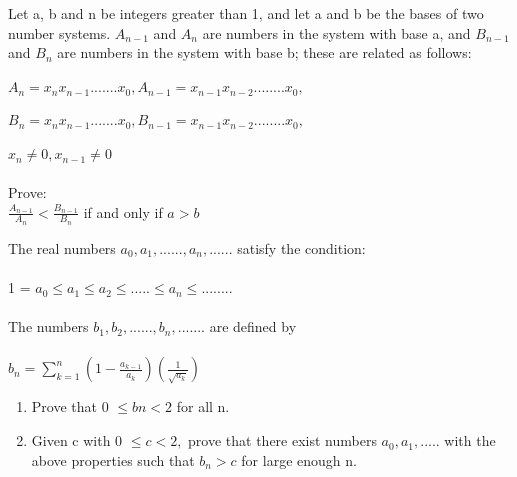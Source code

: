 


\item Let a, b and n be integers greater than 1, and let a and b be the bases of two number systems. $A_{n-1}$ and $A_n$ are numbers in the system with base a,  and $B_{n-1}$ and $B_n$ are numbers in the system with base b; these are related as follows:\\
\\ $A_n = x_nx_{n-1}....... x_0, A_{n-1} = x_{n-1}x_{n-2}........x_0,$\\
\\ $B_n = x_nx_{n-1}....... x_0, B_{n-1} = x_{n-1}x_{n-2}........x_0,$\\
\\ $x_n \neq 0,  x_{n-1} \neq 0$\\
\\ Prove:\\
$\frac{A_{n-1}}{A_n} < \frac{B_{n-1}}{B_n}$ if and only if $a > b$\\

\item The real numbers $a_0, a_1,......, a_n,$...... satisfy the condition:\\
\\ 1 = $a_0 \leq a_1 \leq a_2 \leq ..... \leq a_n \leq ........$\\
\\The numbers $b_1, b_2,......, b_n,$....... are defined by\\
\\ $b_n = \sum_{k=1}^{n}(1-\frac{a_{k-1}}{a_k})(\frac{1}{\sqrt{a_k}})$\\
\begin{enumerate}
\item Prove that 0 $\leq bn < 2$ for all n.
\item Given c with 0 $\leq c < 2,$ prove that there exist numbers $a_0, a_1,$..... with
the above properties such that $b_n > c$ for large enough n.
\end{enumerate}

